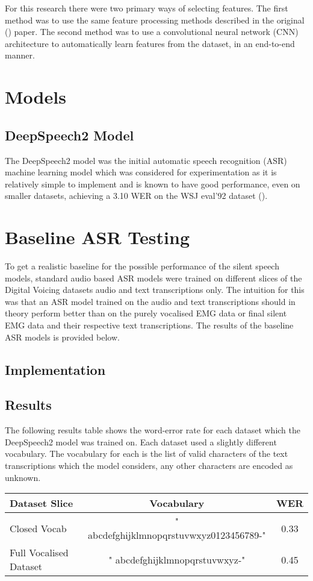For this research there were two primary ways of selecting features. The first method
was to use the same feature processing methods described in the original
(\cite{gaddy2020digital}) paper. The second method was to use a convolutional
neural network (CNN) architecture to automatically learn features from the
dataset, in an end-to-end manner.

\section{Models}

\subsection{DeepSpeech2 Model}

The DeepSpeech2 model was the initial automatic speech recognition (ASR) machine
learning model which was considered for experimentation as it is relatively simple to
implement and is known to have good performance, even on smaller datasets, achieving
a 3.10 WER on the WSJ eval'92 dataset
(\cite{DS2_original}).

\section{Baseline ASR Testing}

To get a realistic baseline for the possible performance of the silent
speech models, standard audio based ASR models were trained on different
slices of the Digital Voicing datasets audio and text transcriptions only.
The intuition for this was that an ASR model trained on the audio and text
transcriptions should in theory perform better than on the purely vocalised
EMG data or final silent EMG data and their respective text transcriptions.
The results of the baseline ASR models is provided below.

\subsection{Implementation}

\subsection{Results}

The following results table shows the word-error rate for each dataset
which the DeepSpeech2 model was trained on. Each dataset used a slightly
different vocabulary. The vocabulary for each is the list of valid characters
of the text transcriptions which the model considers, any other characters
are encoded as unknown.

\begin{center}
\begin{tabular} { | l | c | c | }
Dataset Slice & Vocabulary & WER \\
\hline
Closed Vocab & " abcdefghijklmnopqrstuvwxyz0123456789-" & 0.33 \\
Full Vocalised Dataset & " abcdefghijklmnopqrstuvwxyz-" & 0.45
\end{tabular}
\end{center}